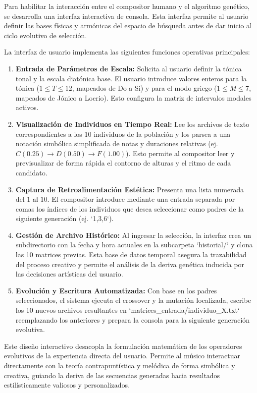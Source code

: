 Para habilitar la interacción entre el compositor humano y el algoritmo genético, se desarrolla una interfaz interactiva de consola. Esta interfaz permite al usuario definir las bases físicas y armónicas del espacio de búsqueda antes de dar inicio al ciclo evolutivo de selección.

La interfaz de usuario implementa las siguientes funciones operativas principales:
\begin{enumerate}
    \item \textbf{Entrada de Parámetros de Escala:} Solicita al usuario definir la tónica tonal y la escala diatónica base. El usuario introduce valores enteros para la tónica ($1 \le T \le 12$, mapeados de Do a Si) y para el modo griego ($1 \le M \le 7$, mapeados de Jónico a Locrio). Esto configura la matriz de intervalos modales activos.
    \item \textbf{Visualización de Individuos en Tiempo Real:} Lee los archivos de texto correspondientes a los 10 individuos de la población y los parsea a una notación simbólica simplificada de notas y duraciones relativas (ej. $C(0.25) \to D(0.50) \to F(1.00)$). Esto permite al compositor leer y previsualizar de forma rápida el contorno de alturas y el ritmo de cada candidato.
    \item \textbf{Captura de Retroalimentación Estética:} Presenta una lista numerada del $1$ al $10$. El compositor introduce mediante una entrada separada por comas los índices de los individuos que desea seleccionar como padres de la siguiente generación (ej. `1,3,6`).
    \item \textbf{Gestión de Archivo Histórico:} Al ingresar la selección, la interfaz crea un subdirectorio con la fecha y hora actuales en la subcarpeta `historial/` y clona las 10 matrices previas. Esta base de datos temporal asegura la trazabilidad del proceso creativo y permite el análisis de la deriva genética inducida por las decisiones artísticas del usuario.
    \item \textbf{Evolución y Escritura Automatizada:} Con base en los padres seleccionados, el sistema ejecuta el crossover y la mutación localizada, escribe los 10 nuevos archivos resultantes en `matrices_entrada/individuo_X.txt` reemplazando los anteriores y prepara la consola para la siguiente generación evolutiva.
\end{enumerate}

Este diseño interactivo desacopla la formulación matemática de los operadores evolutivos de la experiencia directa del usuario. Permite al músico interactuar directamente con la teoría contrapuntística y melódica de forma simbólica y creativa, guiando la deriva de las secuencias generadas hacia resultados estilísticamente valiosos y personalizados.
